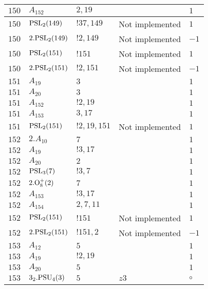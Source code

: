\documentclass[a4paper, 11pt]{article}
\begin{document}
\begin{longtable}{lllll}
        $ 150 $ & $ A_{152} $ & $ 2, 19 $ & $ ~ $ & $ 1$ \\ \hline
        $ 150 $ & $ {\rm PSL}_{2}(149) $ & $ !37, 149 $ &  Not implemented & $ 1$ \\ \hline
        $ 150 $ & $ 2.{\rm PSL}_{2}(149) $ & $ !2, 149 $ &  Not implemented & $ -1$ \\ \hline
        $ 150 $ & $ {\rm PSL}_{2}(151) $ & $ !151 $ &  Not implemented & $ 1$ \\ \hline
        $ 150 $ & $ 2.{\rm PSL}_{2}(151) $ & $ !2, 151 $ &  Not implemented & $ -1$ \\ \hline
        $ 151 $ & $ A_{19} $ & $ 3 $ & $ ~ $ & $ 1$ \\ \hline
        $ 151 $ & $ A_{20} $ & $ 3 $ & $ ~ $ & $ 1$ \\ \hline
        $ 151 $ & $ A_{152} $ & $ !2, 19 $ & $ ~ $ & $ 1$ \\ \hline
        $ 151 $ & $ A_{153} $ & $ 3, 17 $ & $ ~ $ & $ 1$ \\ \hline
        $ 151 $ & $ {\rm PSL}_{2}(151) $ & $ !2, 19, 151 $ &  Not implemented & $ 1$ \\ \hline
        $ 152 $ & $ 2.A_{10} $ & $ 7 $ & $ ~ $ & $ 1$ \\ \hline
        $ 152 $ & $ A_{19} $ & $ ! 3,17 $ & $ ~ $ & $ 1$ \\ \hline
        $ 152 $ & $ A_{20} $ & $ 2 $ & $ ~ $ & $ 1$ \\ \hline
        $ 152 $ & $ {\rm PSL}_{3}(7) $ & $ ! 3,7 $ & $ ~ $ & $ 1$ \\ \hline
        $ 152 $ & $ 2.{\rm O}_{8}^+(2) $ & $ 7 $ & $ ~ $ & $ 1$ \\ \hline
        $ 152 $ & $ A_{153} $ & $ !3, 17 $ & $ ~ $ & $ 1$ \\ \hline
        $ 152 $ & $ A_{154} $ & $ 2, 7, 11 $ & $ ~ $ & $ 1$ \\ \hline
        $ 152 $ & $ {\rm PSL}_{2}(151) $ & $ !151 $ &  Not implemented & $ 1$ \\ \hline
        $ 152 $ & $ 2.{\rm PSL}_{2}(151) $ & $ !151, 2 $ &  Not implemented & $ -1$ \\ \hline
        $ 153 $ & $ A_{12} $ & $ 5 $ & $ ~ $ & $ 1$ \\ \hline
        $ 153 $ & $ A_{19} $ & $ ! 2,19 $ & $ ~ $ & $ 1$ \\ \hline
        $ 153 $ & $ A_{20} $ & $ 5 $ & $ ~ $ & $ 1$ \\ \hline
        $ 153 $ & $ 3_2.{\rm PSU}_{4}(3) $ & $ 5 $ & $ z3 $ &  $\circ$ \\ \hline

\end{longtable}
\end{document}
